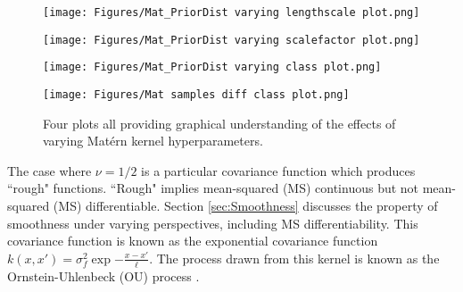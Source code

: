 \documentclass[12pt,a4paper]{article}
\begin{document}
\begin{figure}[h]
    \centering

    \begin{minipage}{0.45\textwidth}
        \centering
        \texttt{[image: Figures/Mat\_PriorDist varying lengthscale plot.png]} %
        \label{fig:Mat_PriorDist varying lengthscale plot}
    \end{minipage} 
    \begin{minipage}{0.45\textwidth}
        \centering
        \texttt{[image: Figures/Mat\_PriorDist varying scalefactor plot.png]} %
        \label{fig:Mat_PriorDist varying scalefactor plot}
    \end{minipage}

    \begin{minipage}{0.45\textwidth}
        \centering
        \texttt{[image: Figures/Mat\_PriorDist varying class plot.png]} %
        \label{fig:Mat_PriorDist varying class plot}
    \end{minipage} 
    \begin{minipage}{0.45\textwidth}
        \centering
        \texttt{[image: Figures/Mat samples diff class plot.png]} %
        \label{fig:Mat samples diff class plot}
    \end{minipage}

    \caption{Four plots all providing graphical understanding of the effects of varying Mat\'{e}rn kernel hyperparameters.}
    \label{fig:Mat varying hyperparameters plots}
\end{figure}

The case where \(\nu = 1/2\) is a particular covariance function which produces ``rough" functions. ``Rough" implies mean-squared (MS) continuous but not mean-squared (MS) differentiable. Section \ref{sec:Smoothness} discusses the property of smoothness under varying perspectives, including MS differentiability. This covariance function is known as the exponential covariance function \(k(x,x') = \sigma_f^2 \exp{-\frac{x-x'}{\ell}}\). The process drawn from this kernel is known as the Ornstein-Uhlenbeck (OU) process \citep{Uhlenbeck1930}.
\end{document}
